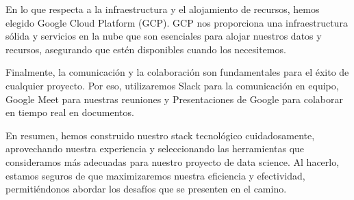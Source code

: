 \documentclass{other/docTemplate}
\begin{document}
En lo que respecta a la infraestructura y el alojamiento de recursos, hemos elegido Google Cloud Platform (GCP). GCP nos proporciona una infraestructura sólida y servicios en la nube que son esenciales para alojar nuestros datos y recursos, asegurando que estén disponibles cuando los necesitemos.

Finalmente, la comunicación y la colaboración son fundamentales para el éxito de cualquier proyecto. Por eso, utilizaremos Slack para la comunicación en equipo, Google Meet para nuestras reuniones y Presentaciones de Google para colaborar en tiempo real en documentos.

En resumen, hemos construido nuestro stack tecnológico cuidadosamente, aprovechando nuestra experiencia y seleccionando las herramientas que consideramos más adecuadas para nuestro proyecto de data science. Al hacerlo, estamos seguros de que maximizaremos nuestra eficiencia y efectividad, permitiéndonos abordar los desafíos que se presenten en el camino.
\end{document}
